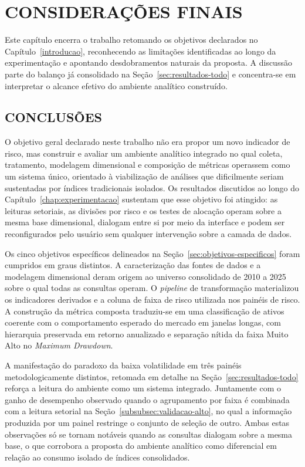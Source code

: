 \chapter{CONSIDERAÇÕES FINAIS}
\label{chap:conclusao}

Este capítulo encerra o trabalho retomando os objetivos declarados no Capítulo~\ref{introducao}, reconhecendo as limitações identificadas ao longo da experimentação e apontando desdobramentos naturais da proposta. A discussão parte do balanço já consolidado na Seção~\ref{sec:resultados-todo} e concentra-se em interpretar o alcance efetivo do ambiente analítico construído.

\section{CONCLUSÕES}
\label{sec:conclusoes}

O objetivo geral declarado neste trabalho não era propor um novo indicador de risco, mas construir e avaliar um ambiente analítico integrado no qual coleta, tratamento, modelagem dimensional e composição de métricas operassem como um sistema único, orientado à viabilização de análises que dificilmente seriam sustentadas por índices tradicionais isolados. Os resultados discutidos ao longo do Capítulo~\ref{chap:experimentacao} sustentam que esse objetivo foi atingido: as leituras setoriais, as divisões por risco e os testes de alocação operam sobre a mesma base dimensional, dialogam entre si por meio da interface e podem ser reconfigurados pelo usuário sem qualquer intervenção sobre a camada de dados.

Os cinco objetivos específicos delineados na Seção~\ref{sec:objetivos-especificos} foram cumpridos em graus distintos. A caracterização das fontes de dados e a modelagem dimensional deram origem ao universo consolidado de 2010 a 2025 sobre o qual todas as consultas operam. O \textit{pipeline} de transformação materializou os indicadores derivados e a coluna de faixa de risco utilizada nos painéis de risco. A construção da métrica composta traduziu-se em uma classificação de ativos coerente com o comportamento esperado do mercado em janelas longas, com hierarquia preservada em retorno anualizado e separação nítida da faixa Muito Alto no \textit{Maximum Drawdown}.

A manifestação do paradoxo da baixa volatilidade em três painéis metodologicamente distintos, retomada em detalhe na Seção~\ref{sec:resultados-todo} reforça a leitura do ambiente como um sistema integrado. Juntamente com o ganho de desempenho observado quando o agrupamento por faixa é combinada com a leitura setorial na Seção~\ref{subsubsec:validacao-alto}, no qual a informação produzida por um painel restringe o conjunto de seleção de outro. Ambas estas observações só se tornam notáveis quando as consultas dialogam sobre a mesma base, o que corrobora a proposta do ambiente analítico como diferencial em relação ao consumo isolado de índices consolidados.

